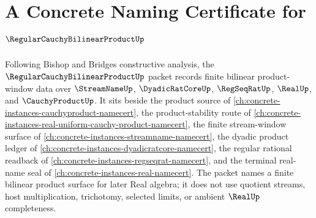 \chapter{A Concrete Naming Certificate for $\RegularCauchyBilinearProductUp$}
\label{ch:concrete-instances-regular-cauchy-bilinear-product-namecert}

Following Bishop and Bridges constructive analysis, the $\RegularCauchyBilinearProductUp$ packet records finite bilinear product-window data over $\StreamNameUp$, $\DyadicRatCoreUp$, $\RegSeqRatUp$, $\RealUp$, and $\CauchyProductUp$. It sits beside the product source of \autoref{ch:concrete-instances-cauchyproduct-namecert}, the product-stability route of \autoref{ch:concrete-instances-real-uniform-cauchy-product-namecert}, the finite stream-window surface of \autoref{ch:concrete-instances-streamname-namecert}, the dyadic product ledger of \autoref{ch:concrete-instances-dyadicratcore-namecert}, the regular rational readback of \autoref{ch:concrete-instances-regseqrat-namecert}, and the terminal real-name seal of \autoref{ch:concrete-instances-real-namecert}. The packet names a finite bilinear product surface for later Real algebra; it does not use quotient streams, host multiplication, trichotomy, selected limits, or ambient $\RealUp$ completeness.


